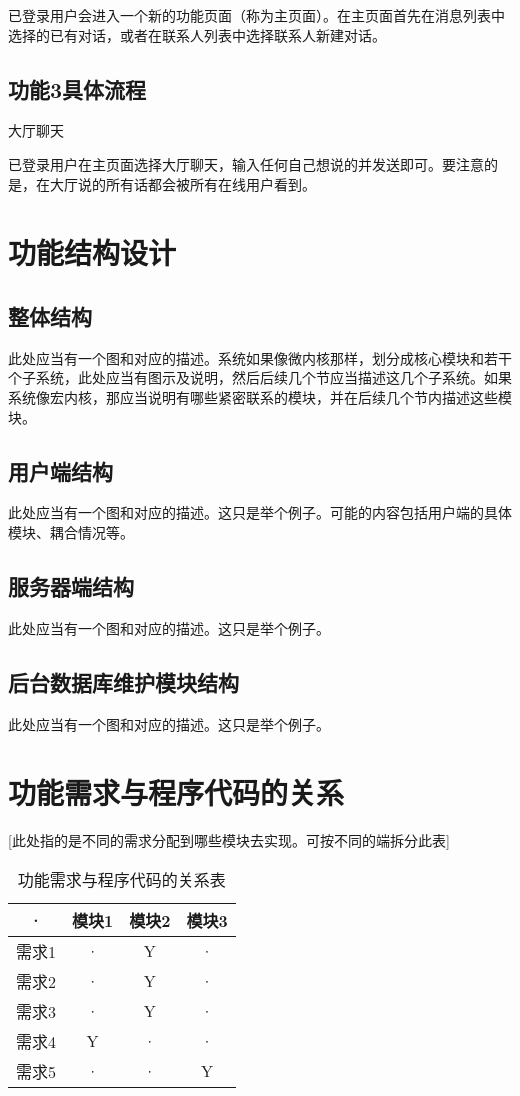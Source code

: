 已登录用户会进入一个新的功能页面（称为主页面）。在主页面首先在消息列表中选择的已有对话，或者在联系人列表中选择联系人新建对话。

\subsection{功能3具体流程}

大厅聊天

已登录用户在主页面选择大厅聊天，输入任何自己想说的并发送即可。要注意的是，在大厅说的所有话都会被所有在线用户看到。



\section{功能结构设计}
\subsection{整体结构}
此处应当有一个图和对应的描述。系统如果像微内核那样，划分成核心模块和若干个子系统，此处应当有图示及说明，然后后续几个节应当描述这几个子系统。如果系统像宏内核，那应当说明有哪些紧密联系的模块，并在后续几个节内描述这些模块。

\subsection{用户端结构}
此处应当有一个图和对应的描述。这只是举个例子。可能的内容包括用户端的具体模块、耦合情况等。

\subsection{服务器端结构}
此处应当有一个图和对应的描述。这只是举个例子。

\subsection{后台数据库维护模块结构}
此处应当有一个图和对应的描述。这只是举个例子。



\section{功能需求与程序代码的关系}
[此处指的是不同的需求分配到哪些模块去实现。可按不同的端拆分此表]
\begin{table}[htbp]
\centering
\caption{功能需求与程序代码的关系表} \label{tab:requirement-module}
\begin{tabular}{|c|c|c|c|}
    \hline
    · & 模块1 & 模块2 & 模块3 \\
    \hline
    需求1 & · & Y & · \\
    \hline
    需求2 & · & Y & · \\
    \hline
    需求3 & · & Y & · \\
    \hline
    需求4 & Y & · & · \\
    \hline
    需求5 & · & · & Y \\
    \hline
\end{tabular}
\end{table}